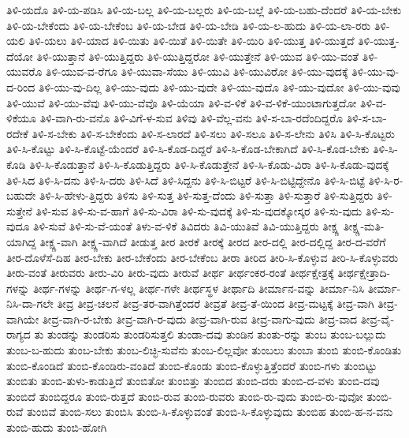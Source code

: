 {ತಿಳಿ-ಯದೊ
ತಿಳಿ-ಯ-ಪಡಿಸಿ
ತಿಳಿ-ಯ-ಬಲ್ಲ
ತಿಳಿ-ಯ-ಬಲ್ಲರು
ತಿಳಿ-ಯ-ಬಲ್ಲೆ
ತಿಳಿ-ಯ-ಬಹು-ದೆಂದರೆ
ತಿಳಿ-ಯ-ಬೇಕು
ತಿಳಿ-ಯ-ಬೇಕೆಂದು
ತಿಳಿ-ಯ-ಬೇಕೆಂಬ
ತಿಳಿ-ಯ-ಬೇಡ
ತಿಳಿ-ಯ-ಬೇಡಿ
ತಿಳಿ-ಯ-ಲ-ಹುದು
ತಿಳಿ-ಯ-ಲಾ-ರರು
ತಿಳಿ-ಯಲಿ
ತಿಳಿ-ಯಲು
ತಿಳಿ-ಯಾದ
ತಿಳಿ-ಯಿತು
ತಿಳಿ-ಯಿತೆ
ತಿಳಿ-ಯಿತೇ
ತಿಳಿ-ಯಿರಿ
ತಿಳಿ-ಯುತ್ತ
ತಿಳಿ-ಯುತ್ತದೆ
ತಿಳಿ-ಯುತ್ತ-ದೆಯೋ
ತಿಳಿ-ಯುತ್ತಾನೆ
ತಿಳಿ-ಯುತ್ತಿದ್ದರು
ತಿಳಿ-ಯುತ್ತಿದ್ದರೋ
ತಿಳಿ-ಯುತ್ತೇನೆ
ತಿಳಿ-ಯುವ
ತಿಳಿ-ಯು-ವಂತೆ
ತಿಳಿ-ಯುವರೊ
ತಿಳಿ-ಯುವ-ವ-ರೆಗೂ
ತಿಳಿ-ಯುವಾ-ಸೆಯು
ತಿಳಿ-ಯುವಿ
ತಿಳಿ-ಯುವಿರೋ
ತಿಳಿ-ಯು-ವುದಕ್ಕೆ
ತಿಳಿ-ಯು-ವು-ದ-ರಿಂದ
ತಿಳಿ-ಯು-ವು-ದಿಲ್ಲ
ತಿಳಿ-ಯು-ವುದು
ತಿಳಿ-ಯು-ವುದೇ
ತಿಳಿ-ಯು-ವುದೊ
ತಿಳಿ-ಯು-ವುದೋ
ತಿಳಿ-ಯು-ವುವು
ತಿಳಿ-ಯುವೆ
ತಿಳಿ-ಯು-ವೆವು
ತಿಳಿ-ಯು-ವೆವೊ
ತಿಳಿ-ಯೆಯಾ
ತಿಳಿ-ವ-ಳಿಕೆ
ತಿಳಿ-ವ-ಳಿಕೆ-ಯುಂಟಾಗುತ್ತದೋ
ತಿಳಿ-ವ-ಳಿಕೆಯೂ
ತಿಳಿ-ವಾಗಿ-ರು-ವನೊ
ತಿಳಿ-ವಿಗೆ-ಳ-ಸುವ
ತಿಳಿವು
ತಿಳಿ-ವೆಲ್ಲ-ವನು
ತಿಳಿ-ಸ-ಬಾ-ರದೆಂದಿದ್ದರೊ
ತಿಳಿ-ಸ-ಬಾ-ರದೇಕೆ
ತಿಳಿ-ಸ-ಬೇಕು
ತಿಳಿ-ಸ-ಬೇಕೆಂದು
ತಿಳಿ-ಸ-ಲಾರದೆ
ತಿಳಿ-ಸಲು
ತಿಳಿ-ಸಲೂ
ತಿಳಿ-ಸ-ಲೇನು
ತಿಳಿಸಿ
ತಿಳಿ-ಸಿ-ಕೊಟ್ಟರು
ತಿಳಿ-ಸಿ-ಕೊಟ್ಟು
ತಿಳಿ-ಸಿ-ಕೊಟ್ಟೆ-ಯೆಂದರೆ
ತಿಳಿ-ಸಿ-ಕೊಡ-ದಿದ್ದರೆ
ತಿಳಿ-ಸಿ-ಕೊಡ-ಬೇಕಾಗಿದೆ
ತಿಳಿ-ಸಿ-ಕೊಡ-ಬೇಕು
ತಿಳಿ-ಸಿ-ಕೊಡಿ
ತಿಳಿ-ಸಿ-ಕೊಡುತ್ತಾನೆ
ತಿಳಿ-ಸಿ-ಕೊಡುತ್ತಿದ್ದರು
ತಿಳಿ-ಸಿ-ಕೊಡುತ್ತೇನೆ
ತಿಳಿ-ಸಿ-ಕೊಡು-ವಿರಾ
ತಿಳಿ-ಸಿ-ಕೊಡು-ವುದಕ್ಕೆ
ತಿಳಿ-ಸಿದ
ತಿಳಿ-ಸಿ-ದನು
ತಿಳಿ-ಸಿ-ದರು
ತಿಳಿ-ಸಿದೆ
ತಿಳಿ-ಸಿದ್ದನು
ತಿಳಿ-ಸಿ-ಬಿಟ್ಟರೆ
ತಿಳಿ-ಸಿ-ಬಿಟ್ಟಿದ್ದೇನೊ
ತಿಳಿ-ಸಿ-ಬಿಟ್ಟೆ
ತಿಳಿ-ಸಿ-ರ-ಬಹುದೇ
ತಿಳಿ-ಸಿ-ಹೇಳು-ತ್ತಿದ್ದರು
ತಿಳಿಸು
ತಿಳಿ-ಸುತ್ತ
ತಿಳಿ-ಸುತ್ತ-ದೆಂದು
ತಿಳಿ-ಸುತ್ತಾ
ತಿಳಿ-ಸುತ್ತಾರೆ
ತಿಳಿ-ಸುತ್ತಿದ್ದರು
ತಿಳಿ-ಸುತ್ತೇನೆ
ತಿಳಿ-ಸುವ
ತಿಳಿ-ಸು-ವ-ಹಾಗೆ
ತಿಳಿ-ಸು-ವಿರಾ
ತಿಳಿ-ಸು-ವುದಕ್ಕೆ
ತಿಳಿ-ಸು-ವುದಕ್ಕೋಸ್ಕರ
ತಿಳಿ-ಸು-ವುದು
ತಿಳಿ-ಸು-ವುದೂ
ತಿಳಿ-ಸುವೆ
ತಿಳಿ-ಸು-ವೆ-ಯಂತೆ
ತಿಳು-ವ-ಳಿಕೆ
ತಿವಿದರು
ತಿವಿ-ಯುತಿವೆ
ತಿವಿ-ಯುತ್ತಿದ್ದರು
ತೀಕ್ಷ್ಣ
ತೀಕ್ಷ್ಣ-ಮತಿ-ಯಾಗಿದ್ದ
ತೀಕ್ಷ್ಣ-ವಾಗಿ
ತೀಕ್ಷ್ಣ-ವಾಗಿದೆ
ತೀಡುತ್ತ
ತೀರ
ತೀರಕೆ
ತೀರಕ್ಕೆ
ತೀರದ
ತೀರ-ದಲ್ಲಿ
ತೀರ-ದಲ್ಲಿದ್ದ
ತೀರ-ದ-ವರೆಗೆ
ತೀರ-ದೊಳೆಸೆ-ದಿಹ
ತೀರ-ಬೇಕು
ತೀರ-ಬೇಕೆಂದು
ತೀರ-ಬೇಕೆಂಬ
ತೀರಾ
ತೀರಿದ
ತೀರಿ-ಸಿ-ಕೊಳ್ಳುವ
ತೀರಿ-ಸಿ-ಕೊಳ್ಳುವರು
ತೀರು-ವಂತೆ
ತೀರುವರು
ತೀರು-ವಿರಿ
ತೀರು-ವುದು
ತೀರುವೆ
ತೀರ್ಥ
ತೀರ್ಥಂಕರ-ರಂತೆ
ತೀರ್ಥಕ್ಷೇತ್ರಕ್ಕೆ
ತೀರ್ಥಕ್ಷೇತ್ರಾದಿ-ಗಳನ್ನು
ತೀರ್ಥ-ಗಳನ್ನು
ತೀರ್ಥ-ಗ-ಳಲ್ಲ
ತೀರ್ಥ-ಗಳೇ
ತೀರ್ಥಸ್ಥಳ
ತೀರ್ಥಾದಿ
ತೀರ್ಮಾನ-ವನ್ನು
ತೀರ್ಮಾ-ನಿಸಿ
ತೀರ್ಮಾ-ನಿಸಿ-ದಾ-ಗಲೇ
ತೀವ್ರ
ತೀವ್ರ-ಚಲನೆ
ತೀವ್ರ-ತರ-ವಾಗಿತ್ತೆಂದರೆ
ತೀವ್ರತೆ
ತೀವ್ರ-ತೆ-ಯಿಂದ
ತೀವ್ರ-ಮಟ್ಟಕ್ಕೆ
ತೀವ್ರ-ವಾಗಿ
ತೀವ್ರ-ವಾಗಿಯೇ
ತೀವ್ರ-ವಾಗಿ-ರ-ಬೇಕು
ತೀವ್ರ-ವಾಗಿ-ರ-ವುದು
ತೀವ್ರ-ವಾಗಿ-ರುವ
ತೀವ್ರ-ವಾಗು-ವುದು
ತೀವ್ರ-ವಾದ
ತೀವ್ರ-ವೈ-ರಾಗ್ಯದ
ತು
ತುಂಡನ್ನು
ತುಂಡರಿಸು
ತುಂಡರಿಸುತ್ತಲಿ
ತುಂಡಾ-ದವು
ತುಂಡಿನ
ತುಂತು-ರನ್ನು
ತುಂಬ
ತುಂಬ-ಬಲ್ಲುದು
ತುಂಬ-ಬ-ಹುದು
ತುಂಬ-ಬೇಕು
ತುಂಬ-ಲಿಚ್ಛಿ-ಸುವೆನು
ತುಂಬ-ಲಿಲ್ಲವೋ
ತುಂಬಲು
ತುಂಬಾ
ತುಂಬಿ
ತುಂಬಿ-ಕೊಂಡಿತು
ತುಂಬಿ-ಕೊಂಡಿದೆ
ತುಂಬಿ-ಕೊಂಡಿರು-ವಂತಿದೆ
ತುಂಬಿ-ಕೊಂಡು
ತುಂಬಿ-ಕೊಳ್ಳುತ್ತಿತ್ತೆಂದರೆ
ತುಂಬಿ-ಗಳು
ತುಂಬಿಟ್ಟು
ತುಂಬಿತು
ತುಂಬಿ-ತುಳು-ಕಾಡುತ್ತಿದೆ
ತುಂಬಿತೋ
ತುಂಬಿತ್ತು
ತುಂಬಿದ
ತುಂಬಿ-ದರು
ತುಂಬಿ-ದ-ವಳು
ತುಂಬಿ-ದವು
ತುಂಬಿದೆ
ತುಂಬಿದ್ದರೂ
ತುಂಬಿ-ರುತ್ತದೆ
ತುಂಬಿ-ರುವ
ತುಂಬಿ-ರುವರು
ತುಂಬಿ-ರು-ವುದು
ತುಂಬಿ-ರು-ವುವೋ
ತುಂಬಿ-ರುವೆ
ತುಂಬಿವೆ
ತುಂಬಿ-ಸಲು
ತುಂಬಿಸಿ
ತುಂಬಿ-ಸಿ-ಕೊಳ್ಳುವಂತೆ
ತುಂಬಿ-ಸಿ-ಕೊಳ್ಳುವುದು
ತುಂಬಿಹ
ತುಂಬಿ-ಹ-ನ-ವನು
ತುಂಬಿ-ಹುದು
ತುಂಬಿ-ಹೋಗಿ
}
